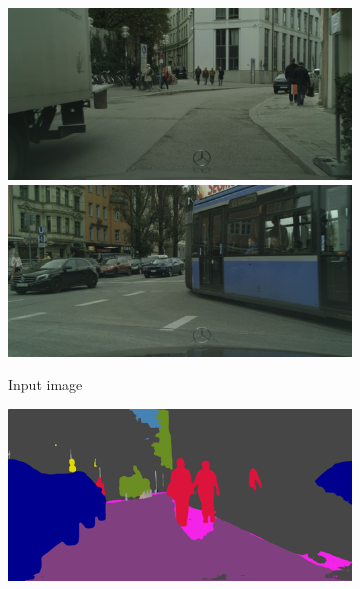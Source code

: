 {\begin{figure}[t]
{{\begin{subfigure}[t]{0.24\linewidth}
\begin{center}
		\includegraphics[width=\linewidth,trim={0px 60px 0 0px},clip]{failure/munich_000158_000019_leftImg8bit.jpg}
		\includegraphics[width=\linewidth,trim={0px 60px 0 0px},clip]{failure/munich_000348_000019_leftImg8bit.jpg}
  \caption{Input image}
\end{center}
\end{subfigure}
\begin{subfigure}[t]{0.24\linewidth}
\begin{center}
		\includegraphics[width=\linewidth,trim={0px 60px 0 0px},clip]{failure/bielefeld_000000_021625_semantic_segmentation_rgb.png}

\end{center}
\end{subfigure}}}
\end{figure}}
